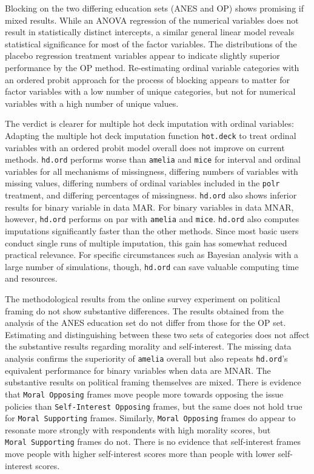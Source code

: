 \documentclass[12pt,econ]{sources/authesis}
\begin{document}
Blocking on the two differing education sets (ANES and OP) shows promising if mixed results. While an ANOVA regression of the numerical variables does not result in statistically distinct intercepts, a similar general linear model reveals statistical significance for most of the factor variables. The distributions of the placebo regression treatment variables appear to indicate slightly superior performance by the OP method. Re-estimating ordinal variable categories with an ordered probit approach for the process of blocking appears to matter for factor variables with a low number of unique categories, but not for numerical variables with a high number of unique values.

The verdict is clearer for multiple hot deck imputation with ordinal variables: Adapting the multiple hot deck imputation function \texttt{hot.deck} to treat ordinal variables with an ordered probit model overall does not improve on current methods. \texttt{hd.ord} performs worse than \texttt{amelia} and \texttt{mice} for interval and ordinal variables for all mechanisms of missingness, differing numbers of variables with missing values, differing numbers of ordinal variables included in the \texttt{polr} treatment, and differing percentages of missingness. \texttt{hd.ord} also shows inferior results for binary variable in data MAR. For binary variables in data MNAR, however, \texttt{hd.ord} performs on par with \texttt{amelia} and \texttt{mice}. \texttt{hd.ord} also computes imputations significantly faster than the other methods. Since most basic users conduct single runs of multiple imputation, this gain has somewhat reduced practical relevance. For specific circumstances such as Bayesian analysis with a large number of simulations, though, \texttt{hd.ord} can save valuable computing time and resources.

The methodological results from the online survey experiment on political framing do not show substantive differences. The results obtained from the analysis of the ANES education set do not differ from those for the OP set. Estimating and distinguishing between these two sets of categories does not affect the substantive results regarding morality and self-interest. The missing data analysis confirms the superiority of \texttt{amelia} overall but also repeats \texttt{hd.ord}'s equivalent performance for binary variables when data are MNAR. The substantive results on political framing themselves are mixed. There is evidence that \texttt{Moral\ Opposing} frames move people more towards opposing the issue policies than \texttt{Self-Interest\ Opposing} frames, but the same does not hold true for \texttt{Moral\ Supporting} frames. Similarly, \texttt{Moral\ Opposing} frames do appear to resonate more strongly with respondents with high morality scores, but \texttt{Moral\ Supporting} frames do not. There is no evidence that self-interest frames move people with higher self-interest scores more than people with lower self-interest scores.
\end{document}
